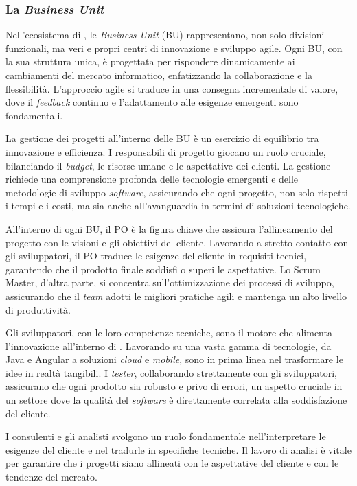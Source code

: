  \subsubsection{\textbf{La \textit{Business Unit}}}

 \noindent Nell'ecosistema di \azienda{}, le \textit{Business Unit} (BU) rappresentano, non solo divisioni funzionali, ma veri e propri centri di innovazione e sviluppo agile. 
 Ogni BU, con la sua struttura unica, è progettata per rispondere dinamicamente ai cambiamenti del mercato informatico, enfatizzando la collaborazione e la flessibilità. 
 L'approccio agile si traduce in una consegna incrementale di valore, dove il \textit{feedback} continuo e l'adattamento alle esigenze emergenti sono fondamentali.
 
 \noindent La gestione dei progetti all'interno delle BU è un esercizio di equilibrio tra innovazione e efficienza. I responsabili di progetto giocano un ruolo cruciale, 
 bilanciando il \textit{budget}, le risorse umane e le aspettative dei clienti. 
 La gestione richiede una comprensione profonda delle tecnologie emergenti e delle metodologie di sviluppo \textit{software}, 
 assicurando che ogni progetto, non solo rispetti i tempi e i costi, ma sia anche all'avanguardia in termini di soluzioni tecnologiche.
 
 \noindent All'interno di ogni BU, il \gls{PO} è la figura chiave che assicura l'allineamento del progetto con le visioni e gli obiettivi del cliente. 
 Lavorando a stretto contatto con gli sviluppatori, il PO traduce le esigenze del cliente in requisiti tecnici, garantendo che il prodotto finale soddisfi o superi le aspettative. 
 Lo \gls{Scrum Master}, d'altra parte, si concentra sull'ottimizzazione dei processi di sviluppo, assicurando che il \textit{team} adotti le migliori pratiche agili e mantenga un alto 
 livello di produttività.
 
 \noindent Gli sviluppatori, con le loro competenze tecniche, sono il motore che alimenta l'innovazione all'interno di \azienda. 
 Lavorando su una vasta gamma di tecnologie, da Java e Angular a soluzioni \textit{cloud} e \textit{mobile}, sono in prima linea nel trasformare le idee in realtà tangibili. 
 I \textit{tester}, collaborando strettamente con gli sviluppatori, assicurano che ogni prodotto sia robusto e privo di errori, un aspetto cruciale in un settore dove 
 la qualità del \textit{software} è direttamente correlata alla soddisfazione del cliente.
 
 \noindent I consulenti e gli \gls{analisti} svolgono un ruolo fondamentale nell'interpretare le esigenze del cliente e nel tradurle in specifiche tecniche. 
 Il lavoro di analisi è vitale per garantire che i progetti siano allineati con le aspettative del cliente e con le tendenze del mercato.
 

